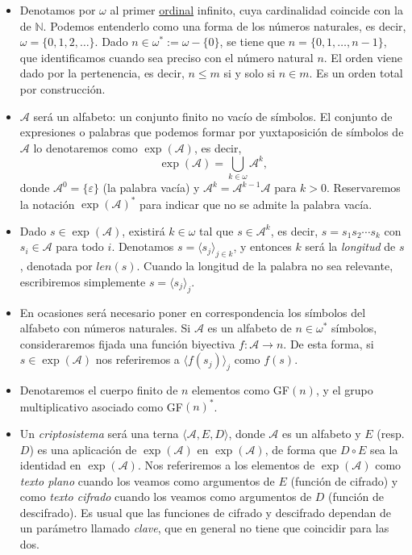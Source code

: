 \documentclass[
  a4paper,
  spanish,
  12pt,
]{scrartcl}
\theoremstyle{ejercicio-style}
\theoremstyle{remark-style}
\theoremstyle{teorema-style}
\begin{document}
\begin{itemize}
\item Denotamos por $\omega$ al primer \href{https://en.wikipedia.org/wiki/Ordinal_number}{ordinal} infinito, cuya cardinalidad coincide con la de $\mathbb{N}$. Podemos entenderlo como una forma de  los números naturales, es decir, $\omega = \{0,1,2, \dots \}$. Dado $n \in \omega^\ast := \omega - \{0\}$, se tiene que $n = \{0, 1, \dots, n-1\}$, que identificamos cuando sea preciso con el número natural $n$. El orden viene dado por la pertenencia, es decir, $n\le m$ si y solo si $n\in m$. Es un orden total por construcción.

\item $\mathcal{A}$ será un alfabeto: un conjunto finito no vacío de símbolos. El conjunto de expresiones o palabras que podemos formar por yuxtaposición de símbolos de $\mathcal{A}$ lo denotaremos como $\exp(\mathcal{A})$, es decir, \[ \exp(\mathcal{A}) = \bigcup_{k \in \omega} \mathcal{A}^k,\] donde $\mathcal{A}^0 = \{\varepsilon\}$ (la palabra vacía) y $\mathcal{A}^k = \mathcal{A}^{k-1}\mathcal{A}$ para $k > 0$. Reservaremos la notación $\exp(\mathcal{A})^\ast$ para indicar que no se admite la palabra vacía.

\item Dado $s \in \exp(\mathcal{A})$, existirá $k \in \omega$ tal que $s \in \mathcal{A}^k$, es decir, $s = s_1s_2\cdots s_k$ con $s_i \in \mathcal{A}$ para todo $i$. Denotamos $s = \langle s_j \rangle_{j \in k}$, y entonces $k$ será la \textit{longitud} de $s$, denotada por $len(s)$. Cuando la longitud de la palabra no sea relevante, escribiremos simplemente $s = \langle s_j \rangle_{j}$.

\item En ocasiones será necesario poner en correspondencia los símbolos del alfabeto con números naturales. Si $\mathcal{A}$ es un alfabeto de $n \in \omega^\ast$ símbolos, consideraremos fijada una función biyectiva $f: \mathcal{A} \to n$. De esta forma, si $s \in \exp(\mathcal{A})$ nos referiremos a $\langle f(s_j) \rangle_j$ como $f(s)$.

\item Denotaremos el cuerpo finito de $n$ elementos como GF$(n)$, y el grupo multiplicativo asociado como GF$(n)^\ast$.

\item Un \textit{criptosistema} será una terna $\langle \mathcal{A}, E, D \rangle$, donde $\mathcal{A}$ es un alfabeto y $E$ (resp. $D$) es una aplicación de $\exp(\mathcal{A})$ en $\exp(\mathcal{A})$, de forma que $D \circ E$ sea la identidad en $\exp(\mathcal{A})$. Nos referiremos a los elementos de $\exp(\mathcal{A})$ como \textit{texto plano} cuando los veamos como argumentos de $E$ (función de cifrado) y como \textit{texto cifrado} cuando los veamos como argumentos de $D$ (función de descifrado). Es usual que las funciones de cifrado y descifrado dependan de un parámetro llamado \textit{clave}, que en general no tiene que coincidir para las dos.
\end{itemize}
\end{document}

